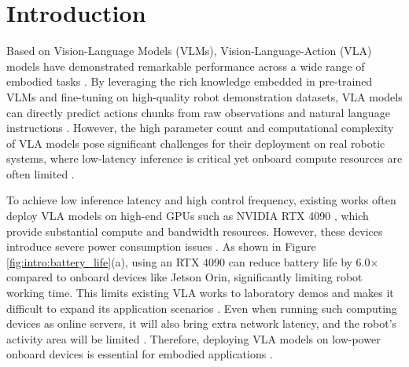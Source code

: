 \section{Introduction}
Based on Vision-Language Models (VLMs), Vision-Language-Action (VLA) models have demonstrated remarkable performance across a wide range of embodied tasks \cite{black2024pi_0,kim2024openvla}. By leveraging the rich knowledge embedded in pre-trained VLMs and fine-tuning on high-quality robot demonstration datasets, VLA models can directly predict actions chunks from raw observations and natural language instructions \cite{intelligence2025pi_05,kim2025fine}. However, the high parameter count and computational complexity of VLA models pose significant challenges for their deployment on real robotic systems, where low-latency inference is critical yet onboard compute resources are often limited \cite{yue2024deer,yang2026dysl,song2025ceed,su2026execution}.

To achieve low inference latency and high control frequency, existing works often deploy VLA models on high-end GPUs such as NVIDIA RTX 4090 \cite{black2024pi_0,intelligence2025pi_05,zhang2026foreact,tang2025vlash,niu2026realtime,yang2026realtime}, which provide substantial compute and bandwidth resources. However, these devices introduce severe power consumption issues \cite{yang2024mcubert,zheng2026kerv}. As shown in Figure \ref{fig:intro:battery_life}(a), using an RTX 4090 can reduce battery life by 6.0$\times$ compared to onboard devices like Jetson Orin, significantly limiting robot working time. 
This limits existing VLA works to laboratory demos and makes it difficult to expand its application scenarios \cite{yu2025survey,guan2025efficient,jiang2026fast}.
Even when running such computing devices as online servers, it will also bring extra network latency, and the robot's activity area will be limited \cite{jiang2026fast,yang2026efficientnav}.
Therefore, deploying VLA models on low-power onboard devices is essential for embodied applications \cite{jiang2026fast,hirose2026asyncvla,budzianowski2025edgevla,zheng2026rapid,dai2025actionflow}.

